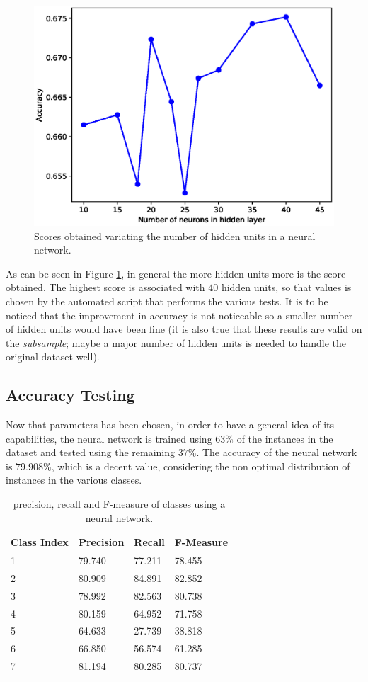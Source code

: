 \documentclass[a4paper, 10pt]{article}
\begin{document}
\begin{figure}[H]
 \centering
 \includegraphics[width=0.8\linewidth]{pictures/nn_hidden_units.eps}
 \caption{Scores obtained variating the number of hidden units in a neural network.}
 \label{fig:nn_hidden_units}
\end{figure}

As can be seen in Figure \ref{fig:nn_hidden_units}, in general the more hidden units more is the score obtained. The highest score is associated with $40$ hidden units, so that values is chosen by the automated script that performs the various tests. It is to be noticed that the improvement in accuracy is not noticeable so a smaller number of hidden units would have been fine (it is also true that these results are valid on the \emph{subsample}; maybe a major number of hidden units is needed to handle the original dataset well).

\subsection{Accuracy Testing}
Now that parameters has been chosen, in order to have a general idea of its capabilities, the neural network is trained using $63\%$ of the instances in the dataset and tested using the remaining $37\%$. The accuracy of the neural network is $79.908\%$, which is a decent value, considering the non optimal distribution of instances in the various classes.

\begin{table}[H]
\centering
\begin{tabular}{|l|l|l|l|}
\hline
\textbf{Class Index} & \textbf{Precision} & \textbf{Recall} & \textbf{F-Measure}\\\hline
1 & 79.740 & 77.211& 78.455\\\hline
2 & 80.909 & 84.891& 82.852\\\hline
3 & 78.992 & 82.563& 80.738\\\hline
4 & 80.159 & 64.952& 71.758\\\hline
5 & 64.633 & 27.739& 38.818\\\hline
6 & 66.850 & 56.574& 61.285\\\hline
7 & 81.194 & 80.285& 80.737\\\hline
\end{tabular}
\caption{precision, recall and F-measure of classes using a neural network.}
\label{tab:nn_test_pr}
\end{table}
\end{document}
